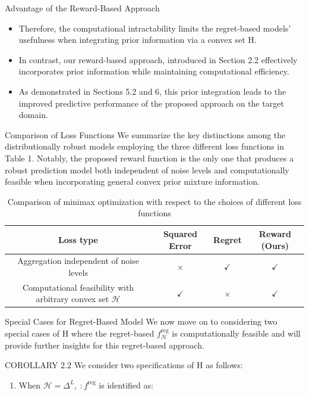 \documentclass{beamer}
\begin{document}
\begin{frame}{Advantage of the Reward-Based Approach}
    \begin{itemize}
        \item Therefore, the computational intractability limits the regret-based models’ usefulness when integrating prior information via a convex set H.
        \item In contrast, our reward-based approach, introduced in Section 2.2 effectively incorporates prior information while maintaining computational efficiency.
        \item As demonstrated in Sections 5.2 and 6, this prior integration leads to the improved predictive performance of the proposed approach on the target domain.
    \end{itemize}
\end{frame}

\begin{frame}{Comparison of Loss Functions}
    We summarize the key distinctions among the distributionally robust models employing the three different loss functions in Table 1. Notably, the proposed reward function is the only one that produces a robust prediction model both independent of noise levels and computationally feasible when incorporating general convex prior mixture information.

    \begin{table}[h]
        \centering
        \caption{Comparison of minimax optimization with respect to the choices of different loss functions}
        \begin{tabular}{c|c|c|c}
            Loss type & Squared Error & Regret & Reward (Ours) \\
            \hline
            Aggregation independent of noise levels & $\times$ & $\checkmark$ & $\checkmark$ \\
            Computational feasibility with arbitrary convex set $\mathcal{H}$ & $\checkmark$ & $\times$ & $\checkmark$ \\
        \end{tabular}
    \end{table}
\end{frame}

\begin{frame}{Special Cases for Regret-Based Model}
    We now move on to considering two special cases of H where the regret-based $f _ { \mathcal { H } } ^ { \mathrm { r e g } }$ is computationally feasible and will provide further insights for this regret-based approach.

    \begin{block}{COROLLARY 2.2}
        We consider two specifications of H as follows:
        \begin{enumerate}
            \item When $\mathcal { H } = \Delta ^ { L } , \ : f ^ { \mathrm { r e g } }$ is identified as:
        \end{enumerate}
    \end{block}
\end{frame}
\end{document}
